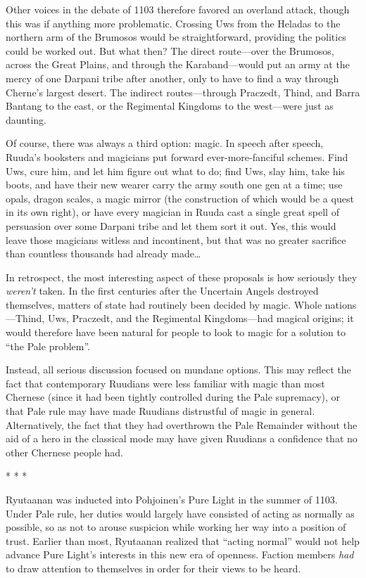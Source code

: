 \documentclass[12pt]{report}
\begin{document}
Other voices in the debate of 1103 therefore favored an overland
attack, though this was if anything more problematic.  Crossing Uws
from the Heladas to the northern arm of the Brumosos would be
straightforward, providing the politics could be worked out.  But what
then?  The direct route---over the Brumosos, across the Great Plains,
and through the Karaband---would put an army at the mercy of one
Darpani tribe after another, only to have to find a way through
Cherne's largest desert.  The indirect routes---through Praczedt,
Thind, and Barra Bantang to the east, or the Regimental Kingdoms to
the west---were just as daunting.

Of course, there was always a third option: magic.  In speech after
speech, Ruuda's booksters and magicians put forward ever-more-fanciful
schemes.  Find Uws, cure him, and let him figure out what to do; find
Uws, slay him, take his boots, and have their new wearer carry the
army south one gen at a time; use opals, dragon scales, a magic mirror
(the construction of which would be a quest in its own right), or have
every magician in Ruuda cast a single great spell of persuasion over
some Darpani tribe and let them sort it out.  Yes, this would leave
those magicians witless and incontinent, but that was no greater
sacrifice than countless thousands had already made{\ldots}

In retrospect, the most interesting aspect of these proposals is how
seriously they \emph{weren't} taken.  In the first centuries after the
Uncertain Angels destroyed themselves, matters of state had routinely
been decided by magic.  Whole nations---Thind, Uws, Praczedt, and the
Regimental Kingdoms---had magical origins; it would therefore have
been natural for people to look to magic for a solution to ``the Pale
problem''.

Instead, all serious discussion focused on mundane options.  This may
reflect the fact that contemporary Ruudians were less familiar with
magic than most Chernese (since it had been tightly controlled during
the Pale supremacy), or that Pale rule may have made Ruudians
distrustful of magic in general.  Alternatively, the fact that they
had overthrown the Pale Remainder without the aid of a hero in the
classical mode may have given Ruudians a confidence that no other
Chernese people had.

\begin{center}
* * *
\end{center}

Ryutaanan was inducted into Pohjoinen's Pure Light in the summer of
1103.  Under Pale rule, her duties would largely have consisted of
acting as normally as possible, so as not to arouse suspicion while
working her way into a position of trust.  Earlier than most,
Ryutaanan realized that ``acting normal'' would not help advance Pure
Light's interests in this new era of openness.  Faction members
\emph{had} to draw attention to themselves in order for their views to
be heard.
\end{document}
